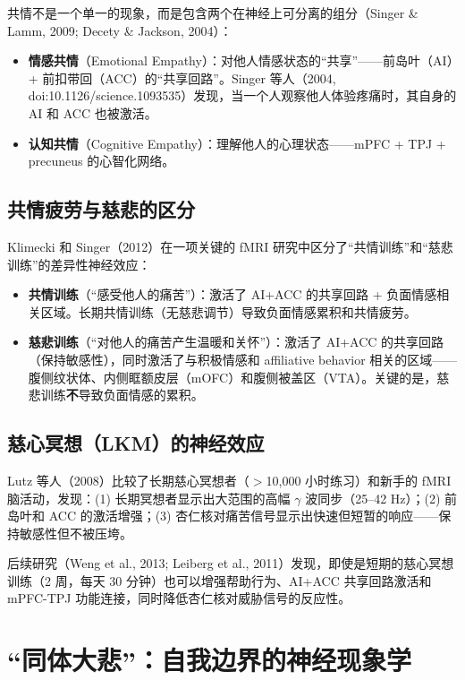 \documentclass[UTF8,12pt,a4paper]{ctexart}
\begin{document}
共情不是一个单一的现象，而是包含两个在神经上可分离的组分（Singer \& Lamm, 2009; Decety \& Jackson, 2004）：

\begin{itemize}[nosep]
    \item \textbf{情感共情}（Emotional Empathy）：对他人情感状态的``共享''——前岛叶（AI）+ 前扣带回（ACC）的``共享回路''。Singer 等人（2004, doi:10.1126/science.1093535）发现，当一个人观察他人体验疼痛时，其自身的 AI 和 ACC 也被激活。
    \item \textbf{认知共情}（Cognitive Empathy）：理解他人的心理状态——mPFC + TPJ + precuneus 的心智化网络。
\end{itemize}

\subsection{共情疲劳与慈悲的区分}

Klimecki 和 Singer（2012）在一项关键的 fMRI 研究中区分了``共情训练''和``慈悲训练''的差异性神经效应：

\begin{itemize}[nosep]
    \item \textbf{共情训练}（``感受他人的痛苦''）：激活了 AI+ACC 的共享回路 + 负面情感相关区域。长期共情训练（无慈悲调节）导致负面情感累积和共情疲劳。
    \item \textbf{慈悲训练}（``对他人的痛苦产生温暖和关怀''）：激活了 AI+ACC 的共享回路（保持敏感性），同时激活了与积极情感和 affiliative behavior 相关的区域——腹侧纹状体、内侧眶额皮层（mOFC）和腹侧被盖区（VTA）。关键的是，慈悲训练\textbf{不}导致负面情感的累积。
\end{itemize}

\subsection{慈心冥想（LKM）的神经效应}

Lutz 等人（2008）比较了长期慈心冥想者（$>$10,000 小时练习）和新手的 fMRI 脑活动，发现：(1) 长期冥想者显示出大范围的高幅 $\gamma$ 波同步（25--42 Hz）；(2) 前岛叶和 ACC 的激活增强；(3) 杏仁核对痛苦信号显示出快速但短暂的响应——保持敏感性但不被压垮。

后续研究（Weng et al., 2013; Leiberg et al., 2011）发现，即使是短期的慈心冥想训练（2 周，每天 30 分钟）也可以增强帮助行为、AI+ACC 共享回路激活和 mPFC-TPJ 功能连接，同时降低杏仁核对威胁信号的反应性。

\section{``同体大悲''：自我边界的神经现象学}
\end{document}
